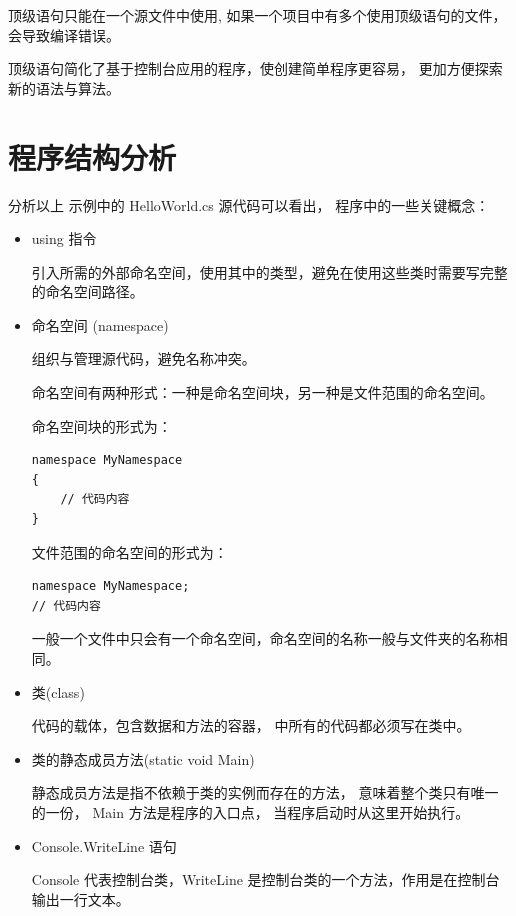 顶级语句只能在一个源文件中使用, 如果一个项目中有多个使用顶级语句的文件，会导致编译错误。

顶级语句简化了基于控制台应用的程序，使创建简单程序更容易， 更加方便探索新的语法与算法。





\section{ \cs  程序结构分析}

分析以上 \cs 示例中的 HelloWorld.cs 源代码可以看出，
\cs  程序中的一些关键概念：
\begin{itemize}
	\item using 指令

	      引入所需的外部命名空间，使用其中的类型，避免在使用这些类时需要写完整的命名空间路径。

	\item 命名空间 (namespace)

	      组织与管理源代码，避免名称冲突。

	      命名空间有两种形式：一种是命名空间块，另一种是文件范围的命名空间。

	      命名空间块的形式为：
	      \begin{lstlisting}
namespace MyNamespace
{
	// 代码内容
}
		\end{lstlisting}

	      文件范围的命名空间的形式为：
	      \begin{lstlisting}
namespace MyNamespace;
// 代码内容
			\end{lstlisting}

	      一般一个文件中只会有一个命名空间，命名空间的名称一般与文件夹的名称相同。

	\item 类(class)

	      \cs 代码的载体，包含数据和方法的容器， \cs 中所有的代码都必须写在类中。

	\item 类的静态成员方法(static void Main)

	      静态成员方法是指不依赖于类的实例而存在的方法， 意味着整个类只有唯一的一份，
	      Main 方法是程序的入口点， 当程序启动时从这里开始执行。

	\item Console.WriteLine 语句

	      Console 代表控制台类，WriteLine 是控制台类的一个方法，作用是在控制台输出一行文本。

\end{itemize}

